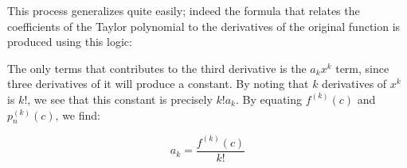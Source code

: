 \documentclass{ximera}
\begin{document}
\begin{exercise}
\begin{exercise}
\begin{exercise}
\begin{exercise}
\begin{exercise}
This process generalizes quite easily; indeed the formula that relates the coefficients of the Taylor polynomial to the derivatives of the original function is produced using this logic:

\begin{image}
  \end{image}

The only terms that contributes to the third derivative is the $a_kx^k$ term, since three derivatives of it will produce a constant.  By noting that $k$ derivatives of $x^k$ is $k!$, we see that this constant is precisely $k!a_k$.  By equating $f^{(k)}(c)$ and $p_n^{(k)}(c)$, we find:

\[
a_k = \frac{f^{(k)}(c)}{k!}
\]


\end{exercise}

\end{exercise}
\end{exercise}
\end{exercise}
\end{exercise}
\end{document}

